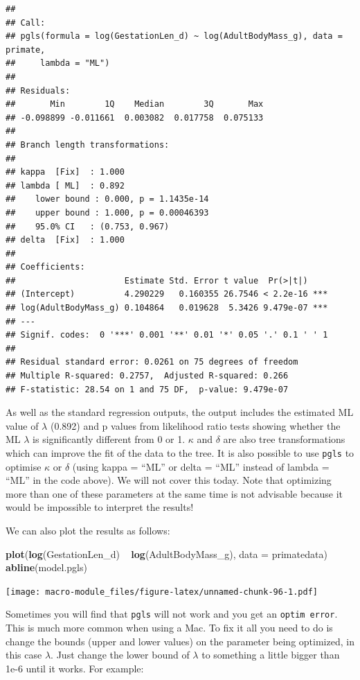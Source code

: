 \documentclass[]{book}
\newenvironment{Shaded}{\begin{snugshade}}{\end{snugshade}}
\newcommand{\KeywordTok}[1]{\textcolor[rgb]{0.13,0.29,0.53}{\textbf{{#1}}}}
\newcommand{\DataTypeTok}[1]{\textcolor[rgb]{0.13,0.29,0.53}{{#1}}}
\newcommand{\StringTok}[1]{\textcolor[rgb]{0.31,0.60,0.02}{{#1}}}
\newcommand{\NormalTok}[1]{{#1}}
\theoremstyle{definition}
\theoremstyle{definition}
\theoremstyle{definition}
\theoremstyle{remark}
\begin{document}
\begin{verbatim}
## 
## Call:
## pgls(formula = log(GestationLen_d) ~ log(AdultBodyMass_g), data = primate, 
##     lambda = "ML")
## 
## Residuals:
##       Min        1Q    Median        3Q       Max 
## -0.098899 -0.011661  0.003082  0.017758  0.075133 
## 
## Branch length transformations:
## 
## kappa  [Fix]  : 1.000
## lambda [ ML]  : 0.892
##    lower bound : 0.000, p = 1.1435e-14
##    upper bound : 1.000, p = 0.00046393
##    95.0% CI   : (0.753, 0.967)
## delta  [Fix]  : 1.000
## 
## Coefficients:
##                      Estimate Std. Error t value  Pr(>|t|)    
## (Intercept)          4.290229   0.160355 26.7546 < 2.2e-16 ***
## log(AdultBodyMass_g) 0.104864   0.019628  5.3426 9.479e-07 ***
## ---
## Signif. codes:  0 '***' 0.001 '**' 0.01 '*' 0.05 '.' 0.1 ' ' 1
## 
## Residual standard error: 0.0261 on 75 degrees of freedom
## Multiple R-squared: 0.2757,  Adjusted R-squared: 0.266 
## F-statistic: 28.54 on 1 and 75 DF,  p-value: 9.479e-07
\end{verbatim}

As well as the standard regression outputs, the output includes the
estimated ML value of \(\lambda\) (0.892) and p values from likelihood
ratio tests showing whether the ML \(\lambda\) is significantly
different from 0 or 1. \(\kappa\) and \(\delta\) are also tree
transformations which can improve the fit of the data to the tree. It is
also possible to use \texttt{pgls} to optimise \(\kappa\) or \(\delta\)
(using kappa = ``ML'' or delta = ``ML'' instead of lambda = ``ML'' in
the code above). We will not cover this today. Note that optimizing more
than one of these parameters at the same time is not advisable because
it would be impossible to interpret the results!

We can also plot the results as follows:

\begin{Shaded}
\begin{Highlighting}[]
\KeywordTok{plot}\NormalTok{(}\KeywordTok{log}\NormalTok{(GestationLen_d) ~}\StringTok{ }\KeywordTok{log}\NormalTok{(AdultBodyMass_g), }\DataTypeTok{data =} \NormalTok{primatedata)}
\KeywordTok{abline}\NormalTok{(model.pgls)}
\end{Highlighting}
\end{Shaded}

\texttt{[image: macro-module\_files/figure-latex/unnamed-chunk-96-1.pdf]}

Sometimes you will find that \texttt{pgls} will not work and you get an
\texttt{optim\ error}. This is much more common when using a Mac. To fix
it all you need to do is change the bounds (upper and lower values) on
the parameter being optimized, in this case \(\lambda\). Just change the
lower bound of \(\lambda\) to something a little bigger than 1e-6 until
it works. For example:
\end{document}
